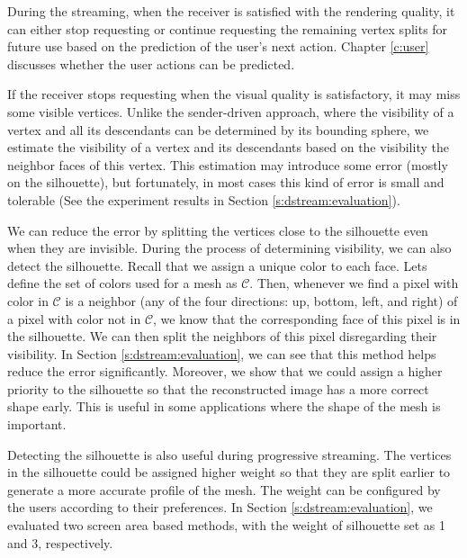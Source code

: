     During the streaming, when the receiver is satisfied with the rendering quality, it 
    can either stop requesting or continue requesting the remaining vertex splits
    for future use based on the prediction of the user's next action.
    Chapter \ref{c:user} discusses whether the user actions can be predicted.

    If the receiver stops requesting %
    when the visual quality is satisfactory, it may miss some visible vertices.
    Unlike the sender-driven approach, where the visibility of a vertex and all its descendants
    can be determined by its bounding sphere, we estimate the visibility of 
    a vertex and its descendants based on the visibility the neighbor faces of this vertex. 
    This estimation may introduce some error (mostly on the silhouette), 
    but fortunately, in most cases this kind of error is small and tolerable
    (See the experiment results in Section \ref{s:dstream:evaluation}).

    We can reduce the error by splitting the vertices close to the silhouette even 
    when they are invisible. During the process of determining visibility, we can also
    detect the silhouette. Recall that we assign a unique color to each face.
    Lets define the set of colors used for a mesh as $\mathcal{C}$.  
    Then, whenever we find a pixel with color in $\mathcal{C}$ 
    is a neighbor (any of the four directions: up, bottom, left, and right)
    of a pixel with color not in $\mathcal{C}$, 
    we know that the corresponding face of this pixel is in the silhouette.
    We can then split the neighbors of this pixel disregarding their visibility.
    In Section \ref{s:dstream:evaluation}, we can see that this method helps
    reduce the error significantly. Moreover, we show that we could assign
    a higher priority to the silhouette so that the reconstructed image has 
    a more correct shape early. This is useful in some applications where the
    shape of the mesh is important.

    Detecting the silhouette is also useful during progressive streaming.
    The vertices in the silhouette could be assigned higher weight so that
    they are split earlier to generate a more accurate profile of the mesh.
    The weight can be configured by the users according to their preferences.
    In Section \ref{s:dstream:evaluation}, we evaluated two screen area based
    methods, with the weight of silhouette set as 1 and 3, respectively.

